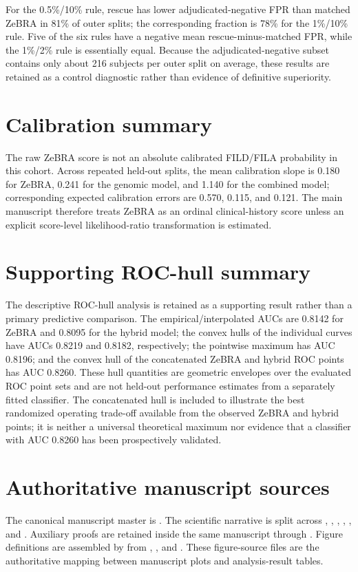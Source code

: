 \documentclass[10pt]{article}
\begin{document}
For the 0.5\%/10\% rule, rescue has lower adjudicated-negative FPR than matched ZeBRA in 81\% of outer splits; the corresponding fraction is 78\% for the 1\%/10\% rule. Five of the six rules have a negative mean rescue-minus-matched FPR, while the 1\%/2\% rule is essentially equal. Because the adjudicated-negative subset contains only about 216 subjects per outer split on average, these results are retained as a control diagnostic rather than evidence of definitive superiority.

\section*{Calibration summary}
The raw ZeBRA score is not an absolute calibrated FILD/FILA probability in this cohort. Across repeated held-out splits, the mean calibration slope is 0.180 for ZeBRA, 0.241 for the genomic model, and 1.140 for the combined model; corresponding expected calibration errors are 0.570, 0.115, and 0.121. The main manuscript therefore treats ZeBRA as an ordinal clinical-history score unless an explicit score-level likelihood-ratio transformation is estimated.

\section*{Supporting ROC-hull summary}
The descriptive ROC-hull analysis is retained as a supporting result rather than a primary predictive comparison. The empirical/interpolated AUCs are 0.8142 for ZeBRA and 0.8095 for the hybrid model; the convex hulls of the individual curves have AUCs 0.8219 and 0.8182, respectively; the pointwise maximum has AUC 0.8196; and the convex hull of the concatenated ZeBRA and hybrid ROC points has AUC 0.8260. These hull quantities are geometric envelopes over the evaluated ROC point sets and are not held-out performance estimates from a separately fitted classifier. The concatenated hull is included to illustrate the best randomized operating trade-off available from the observed ZeBRA and hybrid points; it is neither a universal theoretical maximum nor evidence that a classifier with AUC 0.8260 has been prospectively validated.

\section*{Authoritative manuscript sources}
The canonical manuscript master is . The scientific narrative is split across , , , , , and . Auxiliary proofs are retained inside the same manuscript through . Figure definitions are assembled by  from , , and . These figure-source files are the authoritative mapping between manuscript plots and analysis-result tables.
\end{document}
